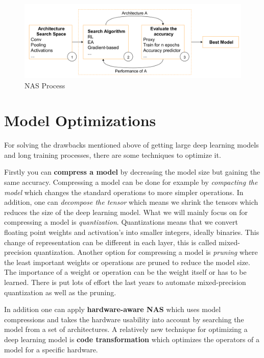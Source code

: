 \documentclass[conference]{IEEEtran}
\begin{document}
\begin{figure}[htbp]
\centerline{\includegraphics[width=\linewidth]{NASProcess.png}}
\caption{NAS Process\cite{bib1}}
\label{fig:NASProcess}
\end{figure}

\section{Model Optimizations}
\label{section:ModelOptimization}
For solving the drawbacks mentioned above of getting large deep learning models and long training processes, there are some techniques to optimize it.

Firstly you can \textbf{compress a model} by decreasing the model size but gaining the same accuracy. Compressing a model can be done for example by \textit{compacting the model} which changes the standard operations to more simpler operations. In addition, one can \textit{decompose the tensor} which means we shrink the tensors which reduces the size of the deep learning model. What we will mainly focus on for compressing a model is \textit{quantization}. Quantizations means that we convert floating point weights and activation's into smaller integers, ideally binaries. This change of representation can be different in each layer, this is called mixed-precision quantization. Another option for compressing a model is \textit{pruning} where the least important weights or operations are pruned to reduce the model size. The importance of a weight or operation can be the weight itself or has to be learned. There is put lots of effort the last years to automate mixed-precision quantization as well as the pruning. 

In addition one can apply \textbf{hardware-aware NAS} which uses model compressions and takes the hardware usability into account by searching the model from a set of architectures. A relatively new technique for optimizing a deep learning model is \textbf{code transformation} which optimizes the operators of a model for a specific hardware.
\end{document}
